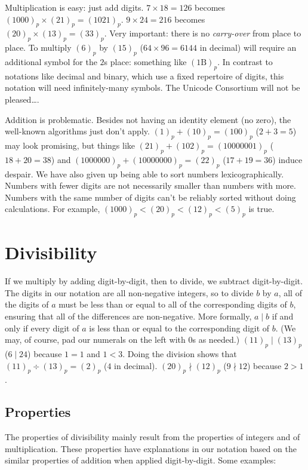 \documentclass[12pt]{article}
\newcommand{\ppn}[1]{(#1)_p}
\begin{document}
Multiplication is easy: just add digits. $7 \times 18 = 126$ becomes $\ppn{1000} \times \ppn{21} = \ppn{1021}$. $9 \times 24 = 216$ becomes $\ppn{20} \times \ppn{13} = \ppn{33}$. Very important: there is no \textit{carry-over} from place to place. To multiply $\ppn{6}$ by $\ppn{15}$ ($64 \times 96 = 6144$ in decimal) will require an additional symbol for the $2$s place: something like $(1\mathrm{B})_p$. In contrast to notations like decimal and binary, which use a fixed repertoire of digits, this notation will need infinitely-many symbols. The Unicode Consortium will not be pleased\ldots.

Addition is problematic. Besides not having an identity element (no zero), the well-known algorithms just don't apply. $\ppn{1} + \ppn{10} = \ppn{100}$ ($2+3=5$) may look promising, but things like $\ppn{21} + \ppn{102} = \ppn{10000001}$ ($18+20=38$) and $\ppn{1000000} + \ppn{10000000} = \ppn{22}$ ($17+19=36$) induce despair. We have also given up being able to sort numbers lexicographically. Numbers with fewer digits are not necessarily smaller than numbers with more. Numbers with the same number of digits can't be reliably sorted without doing calculations. For example, $\ppn{1000} < \ppn{20} < \ppn{12} < \ppn{5}$ is true.

\section*{Divisibility}
If we multiply by adding digit-by-digit, then to divide, we subtract digit-by-digit. The digits in our notation are all non-negative integers, so to divide $b$ by $a$, all of the digits of $a$ must be less than or equal to all of the corresponding digits of $b$, ensuring that all of the differences are non-negative. More formally, $a \mid b$ if and only if every digit of $a$ is less than or equal to the corresponding digit of $b$. (We may, of course, pad our numerals on the left with $0$s as needed.) $\ppn{11} \mid \ppn{13}$ ($6 \mid 24$) because $1 = 1$ and $1 < 3$. Doing the division shows that $\ppn{11} \div \ppn{13} = \ppn{2}$ ($4$ in decimal). $\ppn{20} \nmid \ppn{12}$ ($9 \nmid 12$) because $2 > 1$.

\subsection*{Properties}
The properties of divisibility mainly result from the properties of integers and of multiplication. These properties have explanations in our notation based on the similar properties of addition when applied digit-by-digit. Some examples:
\end{document}
